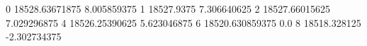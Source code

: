 0 18528.63671875 8.005859375
1 18527.9375 7.306640625
2 18527.66015625 7.029296875
4 18526.25390625 5.623046875
6 18520.630859375 0.0
8 18518.328125 -2.302734375
